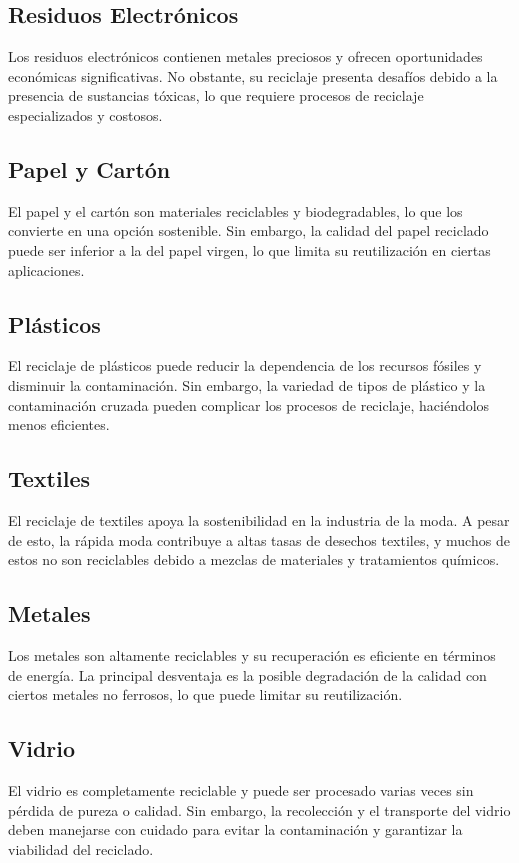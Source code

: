 \documentclass[main.tex]{subfiles}
\begin{document}
\subsection{Residuos Electrónicos}
Los residuos electrónicos contienen metales preciosos y ofrecen oportunidades económicas significativas. No obstante, su reciclaje presenta desafíos debido a la presencia de sustancias tóxicas, lo que requiere procesos de reciclaje especializados y costosos.

\subsection{Papel y Cartón}
El papel y el cartón son materiales reciclables y biodegradables, lo que los convierte en una opción sostenible. Sin embargo, la calidad del papel reciclado puede ser inferior a la del papel virgen, lo que limita su reutilización en ciertas aplicaciones.

\subsection{Plásticos}
El reciclaje de plásticos puede reducir la dependencia de los recursos fósiles y disminuir la contaminación. Sin embargo, la variedad de tipos de plástico y la contaminación cruzada pueden complicar los procesos de reciclaje, haciéndolos menos eficientes.

\subsection{Textiles}
El reciclaje de textiles apoya la sostenibilidad en la industria de la moda. A pesar de esto, la rápida moda contribuye a altas tasas de desechos textiles, y muchos de estos no son reciclables debido a mezclas de materiales y tratamientos químicos.

\subsection{Metales}
Los metales son altamente reciclables y su recuperación es eficiente en términos de energía. La principal desventaja es la posible degradación de la calidad con ciertos metales no ferrosos, lo que puede limitar su reutilización.

\subsection{Vidrio}
El vidrio es completamente reciclable y puede ser procesado varias veces sin pérdida de pureza o calidad. Sin embargo, la recolección y el transporte del vidrio deben manejarse con cuidado para evitar la contaminación y garantizar la viabilidad del reciclado.
\end{document}
